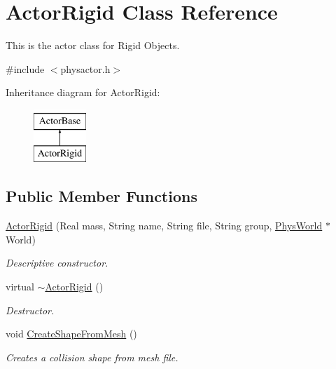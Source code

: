 \hypertarget{classActorRigid}{
\section{ActorRigid Class Reference}
\label{d5/d10/classActorRigid}
}


This is the actor class for Rigid Objects.  




{\ttfamily \#include $<$physactor.h$>$}

Inheritance diagram for ActorRigid:\begin{figure}[H]
\begin{center}
\leavevmode
\includegraphics[height=2cm]{d5/d10/classActorRigid}
\end{center}
\end{figure}
\subsection*{Public Member Functions}
\begin{DoxyCompactItemize}
\item 
\hyperlink{classActorRigid_a99b5b801a7462e987b8dd4437155b9d1}{ActorRigid} (Real mass, String name, String file, String group, \hyperlink{classPhysWorld}{PhysWorld} $\ast$World)
\begin{DoxyCompactList}\small\item\em Descriptive constructor. \item\end{DoxyCompactList}\item 
virtual \hyperlink{classActorRigid_a36b9eb18fc9e83769a48eb1c34312889}{$\sim$ActorRigid} ()
\begin{DoxyCompactList}\small\item\em Destructor. \item\end{DoxyCompactList}\item 
void \hyperlink{classActorRigid_a1a1b7ca97c69bb5420a76116c388b3d1}{CreateShapeFromMesh} ()
\begin{DoxyCompactList}\small\item\em Creates a collision shape from mesh file. \item\end{DoxyCompactList}\end{DoxyCompactItemize}
